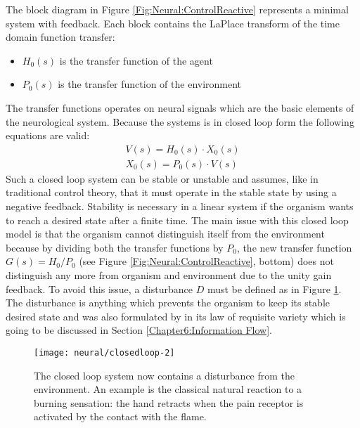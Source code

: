 The block diagram in Figure \ref{Fig:Neural:ControlReactive} represents a minimal system with feedback.
Each block contains the LaPlace transform of the time domain function transfer:
\begin{itemize}
 \item $H_0(s)$ is the transfer function of the agent
 \item $P_0(s)$ is the transfer function of the environment
\end{itemize}
The transfer functions operates on neural signals which are the basic elements
 of the neurological system.
Because the systems is in closed loop form the following equations are valid:
\begin{eqnarray*}
  V(s)= H_0(s) \cdot X_0(s)\\
  X_0(s)=P_0(s) \cdot V(s) 
\end{eqnarray*}
Such a closed loop system can be stable or unstable and \citep{VonFoerster85} assumes,
like in traditional control theory, that it must operate in the stable state by 
using a negative feedback.
Stability is necessary in a linear system if the organism wants to reach a desired
 state after a finite time.
The main issue with this closed loop model is that the organism cannot distinguish
 itself from the environment because by dividing both the transfer functions by $P_0$,
the new transfer function $G(s)=H_0/P_0$ (see Figure \ref{Fig:Neural:ControlReactive}, bottom) 
does not distinguish any more from organism and environment due to the unity gain feedback. 
To avoid this issue, a disturbance $D$ must be defined as in Figure \ref{Fig:Neural:ReactiveDisturbance}.
The disturbance is anything which prevents the organism to keep its stable desired state 
and was also formulated by \citep{Ashby1956:IntroCybernetics} in its law of requisite variety which is going to
 be discussed in Section \ref{Chapter6:Information Flow}.

\begin{figure}[htbp]
\begin{center}
\texttt{[image: neural/closedloop-2]}
\end{center}
\small{
\caption[Closed loop reactive system with disturbance]{
The closed loop system now contains a disturbance from the environment.
An example is the classical natural reaction to a burning sensation:
 the hand retracts when the pain receptor is activated by the contact
with the flame.
\label{Fig:Neural:ReactiveDisturbance}}}
\end{figure}

